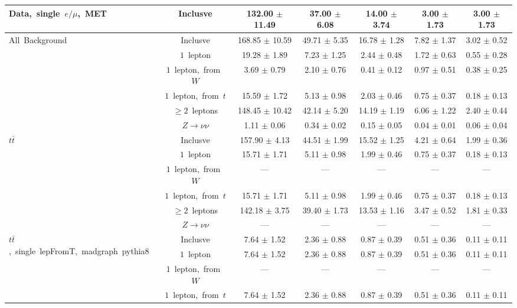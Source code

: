 \documentclass{article}
\begin{document}
\begin{longtable}{|l|c|c|c|c|c|c|}
\multirow{1}{*}{Data,~single~$e/\mu$,~MET} & Inclusve  & 132.00 $\pm$ 11.49  & 37.00 $\pm$ 6.08  & 14.00 $\pm$ 3.74  & 3.00 $\pm$ 1.73  & 3.00 $\pm$ 1.73 \\* 
\hline \hline 
\multirow{6}{*}{All~Background} & Inclusve  & 168.85 $\pm$ 10.59  & 49.71 $\pm$ 5.35  & 16.78 $\pm$ 1.28  & 7.82 $\pm$ 1.37  & 3.02 $\pm$ 0.52 \\* 
 & $1$~lepton  & 19.28 $\pm$ 1.89  & 7.23 $\pm$ 1.25  & 2.44 $\pm$ 0.48  & 1.72 $\pm$ 0.63  & 0.55 $\pm$ 0.28 \\* 
 & $1$~lepton,~from~$W$  & 3.69 $\pm$ 0.79  & 2.10 $\pm$ 0.76  & 0.41 $\pm$ 0.12  & 0.97 $\pm$ 0.51  & 0.38 $\pm$ 0.25 \\* 
 & $1$~lepton,~from~$t$  & 15.59 $\pm$ 1.72  & 5.13 $\pm$ 0.98  & 2.03 $\pm$ 0.46  & 0.75 $\pm$ 0.37  & 0.18 $\pm$ 0.13 \\* 
 & $\ge2$~leptons  & 148.45 $\pm$ 10.42  & 42.14 $\pm$ 5.20  & 14.19 $\pm$ 1.19  & 6.06 $\pm$ 1.22  & 2.40 $\pm$ 0.44 \\* 
 & $Z\rightarrow\nu\nu$  & 1.11 $\pm$ 0.06  & 0.34 $\pm$ 0.02  & 0.15 $\pm$ 0.05  & 0.04 $\pm$ 0.01  & 0.06 $\pm$ 0.04 \\* 
\hline 
\multirow{6}{*}{$t\bar{t}$} & Inclusve  & 157.90 $\pm$ 4.13  & 44.51 $\pm$ 1.99  & 15.52 $\pm$ 1.25  & 4.21 $\pm$ 0.64  & 1.99 $\pm$ 0.36 \\* 
 & $1$~lepton  & 15.71 $\pm$ 1.71  & 5.11 $\pm$ 0.98  & 1.99 $\pm$ 0.46  & 0.75 $\pm$ 0.37  & 0.18 $\pm$ 0.13 \\* 
 & $1$~lepton,~from~$W$  & ---  & ---  & ---  & ---  & --- \\* 
 & $1$~lepton,~from~$t$  & 15.71 $\pm$ 1.71  & 5.11 $\pm$ 0.98  & 1.99 $\pm$ 0.46  & 0.75 $\pm$ 0.37  & 0.18 $\pm$ 0.13 \\* 
 & $\ge2$~leptons  & 142.18 $\pm$ 3.75  & 39.40 $\pm$ 1.73  & 13.53 $\pm$ 1.16  & 3.47 $\pm$ 0.52  & 1.81 $\pm$ 0.33 \\* 
 & $Z\rightarrow\nu\nu$  & ---  & ---  & ---  & ---  & --- \\* 
\hline 
\multirow{6}{*}{$t\bar{t}$,~single~lepFromT,~madgraph~pythia8} & Inclusve  & 7.64 $\pm$ 1.52  & 2.36 $\pm$ 0.88  & 0.87 $\pm$ 0.39  & 0.51 $\pm$ 0.36  & 0.11 $\pm$ 0.11 \\* 
 & $1$~lepton  & 7.64 $\pm$ 1.52  & 2.36 $\pm$ 0.88  & 0.87 $\pm$ 0.39  & 0.51 $\pm$ 0.36  & 0.11 $\pm$ 0.11 \\* 
 & $1$~lepton,~from~$W$  & ---  & ---  & ---  & ---  & --- \\* 
 & $1$~lepton,~from~$t$  & 7.64 $\pm$ 1.52  & 2.36 $\pm$ 0.88  & 0.87 $\pm$ 0.39  & 0.51 $\pm$ 0.36  & 0.11 $\pm$ 0.11 \\* 

\end{longtable}
\end{document}
